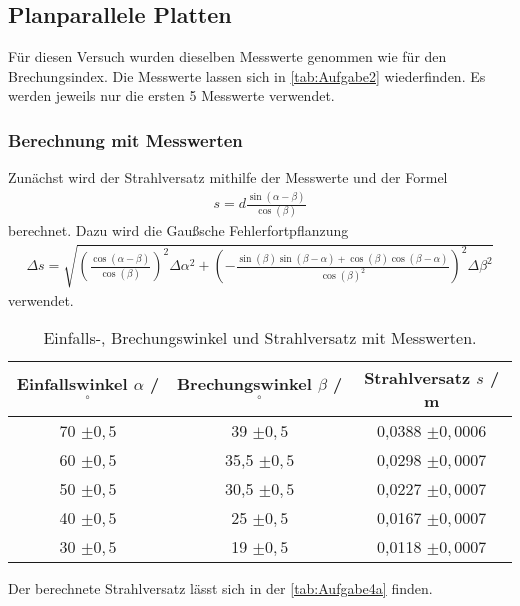 \subsection{Planparallele Platten}

Für diesen Versuch wurden dieselben Messwerte genommen wie für den Brechungsindex. Die Messwerte lassen sich in \autoref{tab:Aufgabe2} wiederfinden.
Es werden jeweils nur die ersten 5 Messwerte verwendet.\\

\subsubsection{Berechnung mit Messwerten}
Zunächst wird der Strahlversatz mithilfe der Messwerte und der Formel
\begin{align}
  \label{eqn:Geschw}
  s = d \frac{\sin(\alpha - \beta)}{\cos(\beta)}
\end{align}
berechnet.
Dazu wird die Gaußsche Fehlerfortpflanzung
\begin{align}
  \label{eqn:Gauss2}
  \Delta s = \sqrt{\left(\frac{\cos(\alpha - \beta)}{\cos(\beta)}\right)^2 \Delta \alpha^2 + \left(-\frac{\sin(\beta)\sin(\beta - \alpha) + \cos(\beta)\cos(\beta - \alpha)}{\cos(\beta)^2}\right)^2 \Delta \beta^2}
\end{align}
verwendet.

\begin{table}
  \centering
  \caption{Einfalls-, Brechungswinkel und Strahlversatz mit Messwerten.}
  \label{tab:Aufgabe4a}
  \begin{tabular}{c c c}
    \toprule
    Einfallswinkel $\alpha$ / $^{\circ}$& Brechungswinkel $\beta$ / $^{\circ}$ & Strahlversatz $s$ / m\\
    \midrule
    70 $\pm 0,5$ & 39 $\pm 0,5$ & 0,0388 $\pm 0,0006$ \\
    60 $\pm 0,5$ & 35,5 $\pm 0,5$ & 0,0298 $\pm 0,0007$\\
    50 $\pm 0,5$ & 30,5 $\pm 0,5$ & 0,0227 $\pm 0,0007$\\
    40 $\pm 0,5$ & 25 $\pm 0,5$ & 0,0167 $\pm 0,0007$\\
    30 $\pm 0,5$ & 19 $\pm 0,5$ & 0,0118 $\pm 0,0007$\\
    \bottomrule
  \end{tabular}
\end{table}

Der berechnete Strahlversatz lässt sich in der \autoref{tab:Aufgabe4a} finden.\\

